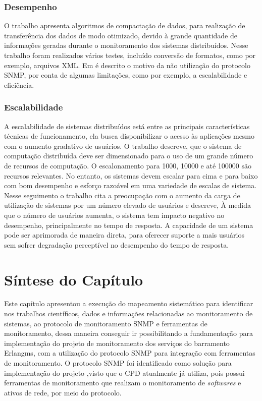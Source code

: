 \subsubsection{Desempenho}

O trabalho \cite{wang2016improvements} apresenta algoritmos de compactação de dados, para realização de transferência dos dados de modo otimizado, devido à grande quantidade de informações geradas durante o monitoramento dos sistemas distribuídos. Nesse trabalho foram realizados vários testes, incluído conversão de formatos, como por exemplo, arquivos XML. Em \cite{kotsopoulos2008soa} é descrito o motivo da não utilização do protocolo SNMP, por conta de algumas limitações, como por exemplo, a escalabilidade e eficiência. 

\subsubsection{Escalabilidade}

A escalabilidade de sistemas distribuídos está entre as principais características técnicas de funcionamento, ela busca disponibilizar o acesso às aplicações mesmo com o aumento gradativo de usuários. O trabalho \cite{1015543} descreve, que o sistema de computação distribuída deve ser dimensionado para o uso de um grande número de recursos de computação. O escalonamento para 1000, 10000 e até 100000 são recursos relevantes. No entanto, os sistemas devem escalar para cima e para baixo com bom desempenho e esforço razoável em uma variedade de escalas de sistema. Nesse seguimento o trabalho \cite{4359423} cita a preocupação com o aumento da carga de utilização de sistemas por um número elevado de usuários e descreve, À medida que o número de usuários aumenta, o sistema tem impacto negativo no desempenho, principalmente no tempo de resposta. A capacidade de um sistema pode ser aprimorada de maneira direta, para oferecer suporte a mais usuários sem sofrer degradação perceptível no desempenho do tempo de resposta. 

\section{Síntese do Capítulo}

Este capítulo apresentou a execução do mapeamento sistemático para identificar nos trabalhos científicos, dados e informações relacionadas ao monitoramento de sistemas, ao protocolo de monitoramento \acrshort{SNMP} e ferramentas de monitoramento, dessa maneira conseguir ir possibilitando a fundamentação para implementação do projeto de monitoramento dos serviços do barramento Erlangms, com a utilização do protocolo \acrshort{SNMP} para integração com ferramentas de monitoramento. O protocolo \acrshort{SNMP} foi identificado como solução para implementação do projeto ,visto que o \acrshort{CPD} atualmente já utiliza, pois  possui ferramentas de monitoramento que realizam o monitoramento de \textit{softwares} e ativos de rede, por meio do protocolo. 

